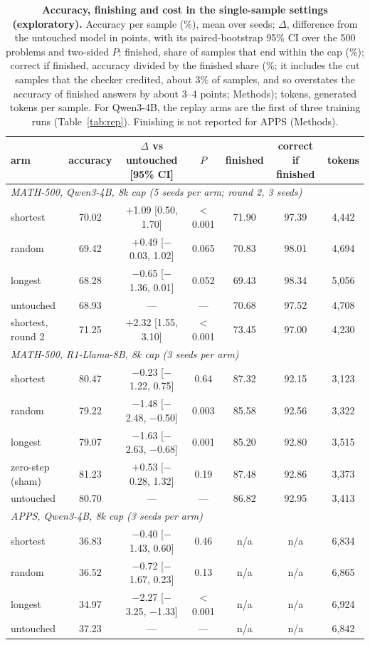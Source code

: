 \documentclass[10pt]{article}
\begin{document}
\begin{table}[t]
\centering\small
\caption{\textbf{Accuracy, finishing and cost in the single-sample settings (exploratory).} Accuracy per sample (\%), mean over seeds; $\Delta$, difference from the untouched model in points, with its paired-bootstrap 95\% CI over the 500 problems and two-sided $P$; finished, share of samples that end within the cap (\%); correct if finished, accuracy divided by the finished share (\%; it includes the cut samples that the checker credited, about 3\% of samples, and so overstates the accuracy of finished answers by about 3--4 points; Methods); tokens, generated tokens per sample. For Qwen3-4B, the replay arms are the first of three training runs (Table~\ref{tab:rep}). Finishing is not reported for APPS (Methods).}
\label{tab:single}
\setlength{\tabcolsep}{5pt}
\begin{tabular}{lcccccc}
\toprule
arm & accuracy & $\Delta$ vs untouched [95\% CI] & $P$ & finished & correct if finished & tokens \\
\midrule
\multicolumn{7}{l}{\textit{MATH-500, Qwen3-4B, 8k cap (5 seeds per arm; round 2, 3 seeds)}} \\
\quad shortest & 70.02 & $+$1.09 [0.50, 1.70] & $<$0.001 & 71.90 & 97.39 & 4{,}442 \\
\quad random & 69.42 & $+$0.49 [$-$0.03, 1.02] & 0.065 & 70.83 & 98.01 & 4{,}694 \\
\quad longest & 68.28 & $-$0.65 [$-$1.36, 0.01] & 0.052 & 69.43 & 98.34 & 5{,}056 \\
\quad untouched & 68.93 & --- & --- & 70.68 & 97.52 & 4{,}708 \\
\quad shortest, round 2 & 71.25 & $+$2.32 [1.55, 3.10] & $<$0.001 & 73.45 & 97.00 & 4{,}230 \\
\multicolumn{7}{l}{\textit{MATH-500, R1-Llama-8B, 8k cap (3 seeds per arm)}} \\
\quad shortest & 80.47 & $-$0.23 [$-$1.22, 0.75] & 0.64 & 87.32 & 92.15 & 3{,}123 \\
\quad random & 79.22 & $-$1.48 [$-$2.48, $-$0.50] & 0.003 & 85.58 & 92.56 & 3{,}322 \\
\quad longest & 79.07 & $-$1.63 [$-$2.63, $-$0.68] & 0.001 & 85.20 & 92.80 & 3{,}515 \\
\quad zero-step (sham) & 81.23 & $+$0.53 [$-$0.28, 1.32] & 0.19 & 87.48 & 92.86 & 3{,}373 \\
\quad untouched & 80.70 & --- & --- & 86.82 & 92.95 & 3{,}413 \\
\multicolumn{7}{l}{\textit{APPS, Qwen3-4B, 8k cap (3 seeds per arm)}} \\
\quad shortest & 36.83 & $-$0.40 [$-$1.43, 0.60] & 0.46 & n/a & n/a & 6{,}834 \\
\quad random & 36.52 & $-$0.72 [$-$1.67, 0.23] & 0.13 & n/a & n/a & 6{,}865 \\
\quad longest & 34.97 & $-$2.27 [$-$3.25, $-$1.33] & $<$0.001 & n/a & n/a & 6{,}924 \\
\quad untouched & 37.23 & --- & --- & n/a & n/a & 6{,}842 \\
\bottomrule
\end{tabular}
\end{table}
\end{document}

